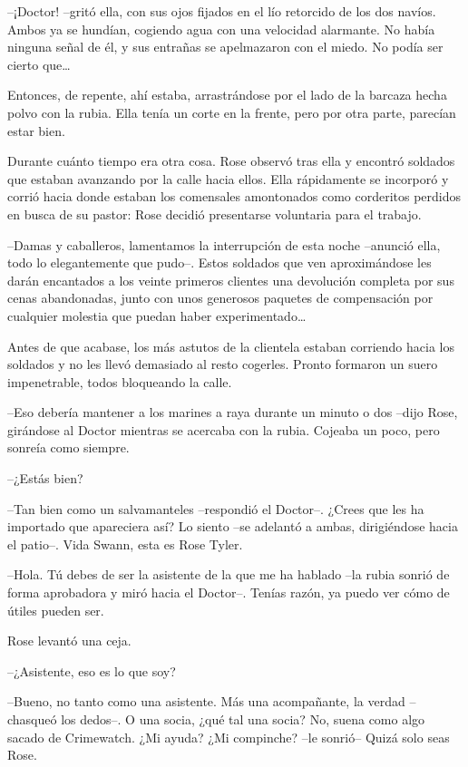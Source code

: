{--¡Doctor! --gritó ella, con sus ojos fijados en el lío retorcido de
 los dos navíos. Ambos ya se hundían, cogiendo agua con una velocidad
 alarmante. No había ninguna señal de él, y sus entrañas se apelmazaron
 con el miedo. No podía ser cierto que\ldots{}}

{Entonces, de repente, ahí estaba, arrastrándose por el lado de la
 barcaza hecha polvo con la rubia. Ella tenía un corte en la frente, pero
por otra parte, parecían estar bien.}

{Durante cuánto tiempo era otra cosa. Rose observó tras ella y encontró
 soldados que estaban avanzando por la calle hacia ellos. Ella
 rápidamente se incorporó y corrió hacia donde estaban los comensales
 amontonados como corderitos perdidos en busca de su pastor: Rose decidió
presentarse voluntaria para el trabajo.}

{--Damas y caballeros, lamentamos la interrupción de esta noche
 --anunció ella, todo lo elegantemente que pudo--. Estos soldados que ven
 aproximándose les darán encantados a los veinte primeros clientes una
 devolución completa por sus cenas abandonadas, junto con unos generosos
 paquetes de compensación por cualquier molestia que puedan haber
 experimentado\ldots{}}

{Antes de que acabase, los más astutos de la clientela estaban corriendo
 hacia los soldados y no les llevó demasiado al resto cogerles. Pronto
formaron un suero impenetrable, todos bloqueando la calle.}

{--Eso debería mantener a los marines a raya durante un minuto o dos
 --dijo Rose, girándose al Doctor mientras se acercaba con la rubia.
Cojeaba un poco, pero sonreía como siempre.}

{--¿Estás bien?}

{--Tan bien como un salvamanteles --respondió el Doctor--. ¿Crees que
 les ha importado que apareciera así? Lo siento --se adelantó a ambas,
dirigiéndose hacia el patio--. Vida Swann, esta es Rose Tyler.}

{--Hola. Tú debes de ser la asistente de la que me ha hablado --la rubia
 sonrió de forma aprobadora y miró hacia el Doctor--. Tenías razón, ya
puedo ver cómo de útiles pueden ser.}

{Rose levantó una ceja.}

{--¿Asistente, eso es lo que soy?}

{--Bueno, no tanto como una asistente. Más una acompañante, la verdad
 --chasqueó los dedos--. O una socia, ¿qué tal una socia? No, suena como
 algo sacado de Crimewatch. ¿Mi ayuda? ¿Mi compinche? --le sonrió-- Quizá
solo seas Rose.}


